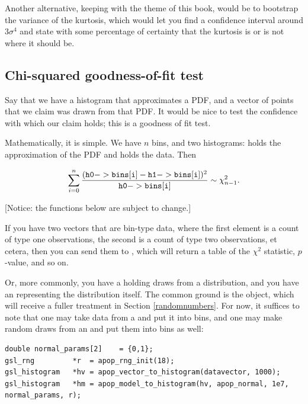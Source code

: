 Another alternative, keeping with the theme of this book, would be
to bootstrap the variance of the kurtosis, which would let you find a
confidence interval around $3 \sigma^4$ and state with some percentage
of certainty that the kurtosis is or is not where it should
be.\label{bootkurt}

\subsection{Chi-squared goodness-of-fit test} 
Say that we have a histogram that approximates a PDF, and a vector of
points that we claim was drawn from that PDF. It would be nice to test
the confidence with which our claim holds; this is a goodness
of fit test.

Mathematically, it is simple. We have $n$ bins, and two histograms:
holds the approximation of the PDF and  holds the data. Then 

\begin{equation}    \label{gofstat}
\sum_{i=0}^n {\frac{({\tt h0->bins[i]} - {\tt h1->bins[i]})^2}{{\tt h0->bins[i]}}} \sim \chi^2_{n-1}.
\end{equation}

[Notice: the functions below are subject to change.]

If you have two vectors that are bin-type data, where the first element
is a count of type one observations, the second is a count of type two
observations, et cetera, then you can send them to
, which will return a table
of the $\chi^2$ statistic, $p$-value, and so on.

Or, more commonly, you have a  holding
draws from a distribution, and you have an 
representing the distribution itself. The common ground is the
 object, which will receive a fuller treatment in
Section \ref{randomnumbers}. For now, it suffices to note that one may
take data from a  and put it into bins, and one may make
random draws from an  and put them into bins as well: 
\begin{lstlisting}
double normal_params[2]    = {0,1};
gsl_rng         *r  = apop_rng_init(18);
gsl_histogram   *hv = apop_vector_to_histogram(datavector, 1000);
gsl_histogram   *hm = apop_model_to_histogram(hv, apop_normal, 1e7, normal_params, r);
\end{lstlisting}

